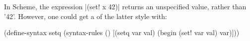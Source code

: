 \documentclass{article}
\begin{document}
In Scheme, the expression
\scheme|(set! x 42)| returns
an unspecified value, rather
than \scheme'42'.  However,
one could get a 
of the latter style with:

\begin{schemedisplay}
(define-syntax setq
  (syntax-rules ()
    [(setq var val)
     (begin (set! var val)
            var)]))
\end{schemedisplay}
\end{document}
